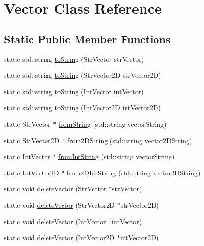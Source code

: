 \hypertarget{classVector}{
\section{\-Vector \-Class \-Reference}
\label{d6/da1/classVector}
}
\subsection*{\-Static \-Public \-Member \-Functions}
\begin{DoxyCompactItemize}
\item 
static std\-::string \hyperlink{classVector_aa392522386fbba694766e9c0958429df}{to\-String} (\-Str\-Vector str\-Vector)
\item 
static std\-::string \hyperlink{classVector_a7ae6a51d5bbbe9735ac17ea353760c2d}{to\-String} (\-Str\-Vector2\-D str\-Vector2\-D)
\item 
static std\-::string \hyperlink{classVector_af8693f4ca191f89ae486c215d2475bb8}{to\-String} (\-Int\-Vector int\-Vector)
\item 
static std\-::string \hyperlink{classVector_aa9f76615a779e0a0b2584168441af1d1}{to\-String} (\-Int\-Vector2\-D int\-Vector2\-D)
\item 
static \-Str\-Vector $\ast$ \hyperlink{classVector_a692c279796aaf703991d8f22ca784ac9}{from\-String} (std\-::string vector\-String)
\item 
static \-Str\-Vector2\-D $\ast$ \hyperlink{classVector_aec2cd0543c6f3a59a448b4d2e5f98a06}{from2\-D\-String} (std\-::string vector2\-D\-String)
\item 
static \-Int\-Vector $\ast$ \hyperlink{classVector_aeb2779e04d4b72c4fe7552137c3b27d7}{from\-Int\-String} (std\-::string vector\-String)
\item 
static \-Int\-Vector2\-D $\ast$ \hyperlink{classVector_a1a0a70e510d0f5afebe8943b12bb341f}{from2\-D\-Int\-String} (std\-::string vector2\-D\-String)
\item 
static void \hyperlink{classVector_a203b84bf61f6d9246f4bbd288daec685}{delete\-Vector} (\-Str\-Vector $\ast$str\-Vector)
\item 
static void \hyperlink{classVector_ac7107f26a72b04e12cb487e5ff464772}{delete\-Vector} (\-Str\-Vector2\-D $\ast$str\-Vector2\-D)
\item 
static void \hyperlink{classVector_ac95b48d002ebd1d40887b7b7d6b8fdff}{delete\-Vector} (\-Int\-Vector $\ast$int\-Vector)
\item 
static void \hyperlink{classVector_a9b146e458fab3206504897347fa81f78}{delete\-Vector} (\-Int\-Vector2\-D $\ast$int\-Vector2\-D)
\end{DoxyCompactItemize}


